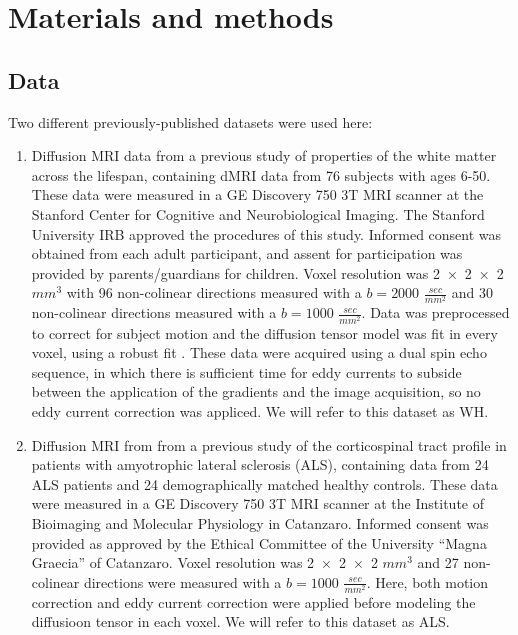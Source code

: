 \section*{Materials and methods}

\subsection*{Data}

Two different previously-published datasets were used here:

\begin{enumerate}

\item Diffusion MRI data from a previous study of properties of the white matter
across the lifespan\cite{yeatman2014lifespan}, containing dMRI data from 76
subjects with ages 6-50. These data were measured in a GE Discovery 750 3T MRI
scanner at the Stanford Center for Cognitive and Neurobiological Imaging. The
Stanford University IRB approved the procedures of this study. Informed consent
was obtained from each adult participant, and assent for participation was
provided by parents/guardians for children. Voxel resolution was
\num{2x2x2}$mm^3$ with 96 non-colinear directions measured with a $b=2000$
$\frac{sec}{mm^2}$ and 30 non-colinear directions measured with a $b=1000$
$\frac{sec}{mm^2}$. Data was preprocessed to correct for subject motion and the
diffusion tensor model \cite{basser1994mr} was fit in every voxel, using a
robust fit \cite{chang2005restore}. These data were acquired using a dual spin
echo sequence, in which there is sufficient time for eddy currents to subside
between the application of the gradients and the image acquisition, so no eddy
current correction was appliced. We will refer to this dataset as WH.

\item Diffusion MRI from from a previous study of the corticospinal tract
profile in patients with amyotrophic lateral sclerosis
(ALS)\cite{sarica2017corticospinal}, containing data from 24 ALS patients and 24
demographically matched healthy controls. These data were measured in a GE
Discovery 750 3T MRI scanner at the Institute of Bioimaging and Molecular
Physiology in Catanzaro. Informed consent was provided as approved by the
Ethical Committee of the University ``Magna Graecia'' of Catanzaro. Voxel
resolution was \num{2x2x2} $mm^3$ and 27 non-colinear directions were
measured with a $b=1000$ $\frac{sec}{mm^2}$. Here, both motion correction and
eddy current correction were applied before modeling the diffusioon tensor in
each voxel. We will refer to this dataset as ALS.

\end{enumerate}

